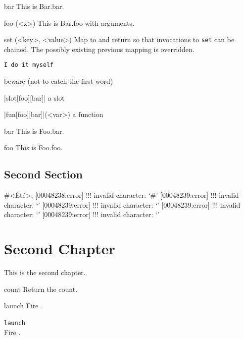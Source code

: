 \documentclass[openright,twoside,11pt]{book}
\begin{document}
\begin{urbiscriptapi}
\item[bar] This is Bar.bar.
\item[foo](<x>) This is Bar.foo with arguments.
\item[set](<key>, <value>) Map  to  and return \this so
  that invocations to \lstinline|set| can be chained.  The possibly existing
  previous mapping is overridden.
\item \lstinline|I do it myself|
\item beware (not to catch the first word)
\item|slot[foo][bar]| a slot
\item|fun[foo][bar]|(<var>) a function
\end{urbiscriptapi}


\begin{urbiscriptapi}
\item[bar] This is Foo.bar.
\item[foo] This is Foo.foo.
\end{urbiscriptapi}

\section{Second Section}

\begin{urbiunchecked}[escapeinside=<>]
#<Été>;
[00048238:error] !!! invalid character: `#'
[00048239:error] !!! invalid character: `'
[00048239:error] !!! invalid character: `'
[00048239:error] !!! invalid character: `'
[00048239:error] !!! invalid character: `'
\end{urbiunchecked}

\chapter{Second Chapter}

This is the second chapter.



\begin{urbiscriptapi}
\item[count] Return the count.
\item[launch]
  Fire \this.
\item \lstinline|launch|~\\
  Fire \this.
\end{urbiscriptapi}
\end{document}

